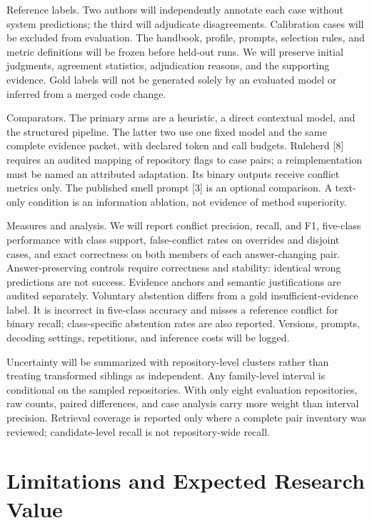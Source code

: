 \documentclass[10pt,conference]{IEEEtran}
\begin{document}
Reference labels. Two authors will independently annotate each case without system predictions; the third will adjudicate disagreements. Calibration cases will be excluded from evaluation. The handbook, profile, prompts, selection rules, and metric definitions will be frozen before held-out runs. We will preserve initial judgments, agreement statistics, adjudication reasons, and the supporting evidence. Gold labels will not be generated solely by an evaluated model or inferred from a merged code change.


Comparators. The primary arms are a heuristic, a direct contextual model, and the structured pipeline. The latter two use one fixed model and the same complete evidence packet, with declared token and call budgets. Ruleherd [8] requires an audited mapping of repository flags to case pairs; a reimplementation must be named an attributed adaptation. Its binary outputs receive conflict metrics only. The published smell prompt [3] is an optional comparison. A text-only condition is an information ablation, not evidence of method superiority.


Measures and analysis. We will report conflict precision, recall, and F1, five-class performance with class support, false-conflict rates on overrides and disjoint cases, and exact correctness on both members of each answer-changing pair. Answer-preserving controls require correctness and stability: identical wrong predictions are not success. Evidence anchors and semantic justifications are audited separately. Voluntary abstention differs from a gold insufficient-evidence label. It is incorrect in five-class accuracy and misses a reference conflict for binary recall; class-specific abstention rates are also reported. Versions, prompts, decoding settings, repetitions, and inference costs will be logged.


Uncertainty will be summarized with repository-level clusters rather than treating transformed siblings as independent. Any family-level interval is conditional on the sampled repositories. With only eight evaluation repositories, raw counts, paired differences, and case analysis carry more weight than interval precision. Retrieval coverage is reported only where a complete pair inventory was reviewed; candidate-level recall is not repository-wide recall.


\section{Limitations and Expected Research Value}
\end{document}
